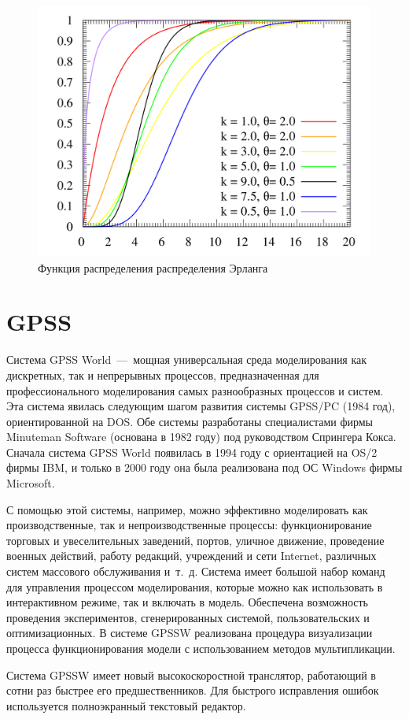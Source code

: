 \begin{figure}[H]
    \begin{center}
    \includegraphics[width=0.5\linewidth]{assets/erlang_Fx.png}
    \caption{Функция распределения распределения Эрланга}
    \label{fig:}
    \end{center}
\end{figure}

\section{GPSS}

Система GPSS World~---~мощная универсальная среда моделирования как дискретных, так и непрерывных процессов, предназначенная для профессионального моделирования самых разнообразных процессов и систем. Эта система явилась следующим шагом развития системы GPSS/PC (1984 год), ориентированной на DOS. Обе системы разработаны специалистами фирмы Minuteman Software (основана в 1982 году) под руководством Спрингера Кокса. Сначала система GPSS World появилась в 1994 году с ориентацией на OS/2 фирмы IBM, и только в 2000 году она была реализована под ОС Windows фирмы Microsoft.

С помощью этой системы, например, можно эффективно моделировать как производственные, так и непроизводственные процессы: функционирование торговых и увеселительных заведений, портов, уличное движение, проведение военных действий, работу редакций, учреждений и сети Internet, различных систем массового обслуживания и~т.~д. Система имеет большой набор команд для управления процессом моделирования, которые можно как использовать в интерактивном режиме, так и включать в модель. Обеспечена возможность проведения экспериментов, сгенерированных системой, пользовательских и оптимизационных. В системе GPSSW реализована процедура визуализации процесса функционирования модели с использованием методов мультипликации.

Система GPSSW имеет новый высокоскоростной транслятор, работающий в сотни раз быстрее его предшественников. Для быстрого исправления ошибок используется полноэкранный текстовый редактор.

